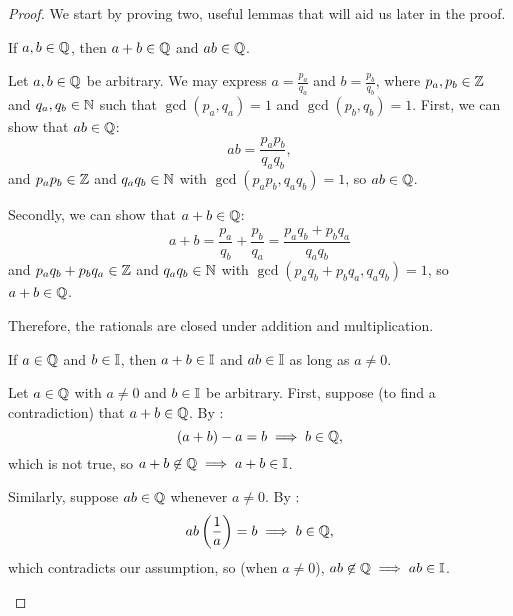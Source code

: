 \begin{proof}
  We start by proving two, useful lemmas that will aid us later in the proof.

    \begin{lemma}\label{lem:rationals-closed-under-addition-multiplication}
      If $a, b \in \mathbb{Q}$, then $a + b \in \mathbb{Q}$ and $ab \in \mathbb{Q}$.
    \end{lemma}

      \begin{subproof}
        Let $a, b \in \mathbb{Q}$ be arbitrary. We may express $a = \frac{p_{a}}{q_{a}}$ and $b = \frac{p_{b}}{q_{b}}$, 
        where $p_{a}, p_{b} \in \mathbb{Z}$ and $q_{a}, q_{b} \in \mathbb{N}$ such that $\gcd(p_{a}, q_{a}) = 1$ and $\gcd(p_{b}, q_{b}) = 1$.
        First, we can show that $ab \in \mathbb{Q}$:
        \[
          ab = \frac{p_{a}p_{b}}{q_{a}q_{b}},
        \]
        and $p_{a}p_{b} \in \mathbb{Z}$ and $q_{a}q_{b} \in \mathbb{N}$ with $\gcd(p_{a}p_{b}, q_{a}q_{b}) = 1$, so $ab \in \mathbb{Q}$.

        Secondly, we can show that $a + b \in \mathbb{Q}$:
        \[
          a + b = \frac{p_{a}}{q_{b}} + \frac{p_{b}}{q_{a}} = \frac{p_{a}q_{b} + p_{b}q_{a}}{q_{a}q_{b}}
        \]
        and $p_{a}q_{b} + p_{b}q_{a} \in \mathbb{Z}$ and $q_{a}q_{b} \in \mathbb{N}$ with 
        $\gcd(p_{a}q_{b} + p_{b}q_{a}, q_{a}q_{b}) = 1$, so $a + b \in \mathbb{Q}$.

        Therefore, the rationals are closed under addition and multiplication. 
      \end{subproof}

    \begin{lemma}\label{lem:rational-irrational-addition-multiplication}
      If $a \in \mathbb{Q}$ and $b \in \mathbb{I}$\footnotemark{}, then $a + b \in \mathbb{I}$ and $ab \in \mathbb{I}$ as long as $a \neq 0$.
    \end{lemma}

    \begin{subproof}
      Let $a \in \mathbb{Q}$ with $a \neq 0$ and $b \in \mathbb{I}$ be arbitrary. 
      First, suppose (to find a contradiction) that $a + b \in \mathbb{Q}$. By :
      \[
        (a + b) - a = b \implies b \in \mathbb{Q},
      \]
      which is not true, so $a + b \not\in \mathbb{Q} \implies a + b \in \mathbb{I}$.

      Similarly, suppose $ab \in \mathbb{Q}$ whenever $a \neq 0$. By :
      \[
        ab \left( \frac{1}{a} \right) = b \implies b \in \mathbb{Q},
      \]
      which contradicts our assumption, so (when $a \neq 0$), $ab \not\in \mathbb{Q} \implies ab \in \mathbb{I}$.
    \end{subproof}


\end{proof}
